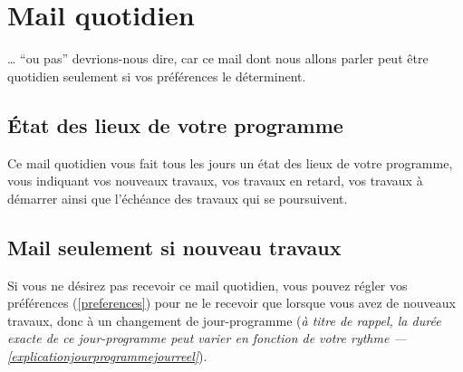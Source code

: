 \chapter{Mail quotidien}

… \enquote{ou pas} devrions-nous dire, car ce mail dont nous allons parler peut être quotidien seulement si vos préférences le déterminent.

\section{État des lieux de votre programme} %
\label{sec:etat_des_lieux_de_votre_programme}


Ce mail quotidien vous fait tous les jours un état des lieux de votre programme, vous indiquant vos nouveaux travaux, vos travaux en retard, vos travaux à démarrer ainsi que l'échéance des travaux qui se poursuivent.

\section{Mail seulement si nouveau travaux} %
\label{sec:mail_seulement_si_nouveau_travaux}

Si vous ne désirez pas recevoir ce mail quotidien, vous pouvez régler vos préférences (\ref{preferences}) pour ne le recevoir que lorsque vous avez de nouveaux travaux, donc à un changement de jour-programme (\emph{à titre de rappel, la durée exacte de ce jour-programme peut varier en fonction de votre rythme — \ref{explicationjourprogrammejourreel}}). 
